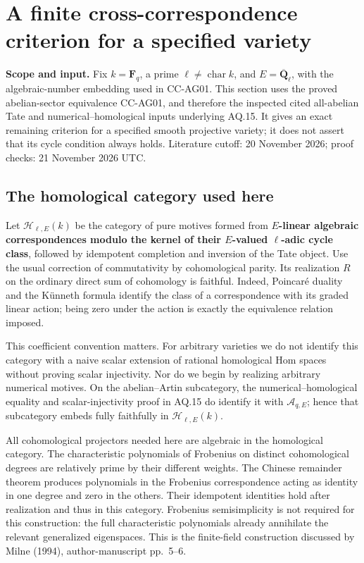 \section{A finite cross-correspondence criterion for a specified
variety}\label{a-finite-cross-correspondence-criterion-for-a-specified-variety}

\textbf{Scope and input.} Fix \(k=\mathbf F_q\), a prime
\(\ell\ne\operatorname{char}k\), and \(E=\overline{\mathbf Q}_\ell\),
with the algebraic-number embedding used in CC-AG01. This section uses
the proved abelian-sector equivalence CC-AG01, and therefore the
inspected cited all-abelian Tate and numerical--homological inputs
underlying AQ.15. It gives an exact remaining criterion for a specified
smooth projective variety; it does not assert that its cycle condition
always holds. Literature cutoff: 20 November 2026; proof checks: 21
November 2026 UTC.

\subsection{The homological category used
here}\label{the-homological-category-used-here}

Let \(\mathcal H_{\ell,E}(k)\) be the category of pure motives formed
from \textbf{\(E\)-linear algebraic correspondences modulo the kernel of
their \(E\)-valued \(\ell\)-adic cycle class}, followed by idempotent
completion and inversion of the Tate object. Use the usual correction of
commutativity by cohomological parity. Its realization \(R\) on the
ordinary direct sum of cohomology is faithful. Indeed, Poincaré duality
and the Künneth formula identify the class of a correspondence with its
graded linear action; being zero under the action is exactly the
equivalence relation imposed.

This coefficient convention matters. For arbitrary varieties we do not
identify this category with a naive scalar extension of rational
homological Hom spaces without proving scalar injectivity. Nor do we
begin by realizing arbitrary numerical motives. On the abelian--Artin
subcategory, the numerical--homological equality and scalar-injectivity
proof in AQ.15 do identify it with \(\mathcal A_{q,E}\); hence that
subcategory embeds fully faithfully in \(\mathcal H_{\ell,E}(k)\).

All cohomological projectors needed here are algebraic in the
homological category. The characteristic polynomials of Frobenius on
distinct cohomological degrees are relatively prime by their different
weights. The Chinese remainder theorem produces polynomials in the
Frobenius correspondence acting as identity in one degree and zero in
the others. Their idempotent identities hold after realization and thus
in this category. Frobenius semisimplicity is not required for this
construction: the full characteristic polynomials already annihilate the
relevant generalized eigenspaces. This is the finite-field construction
discussed by Milne (1994), author-manuscript pp.~5--6.

